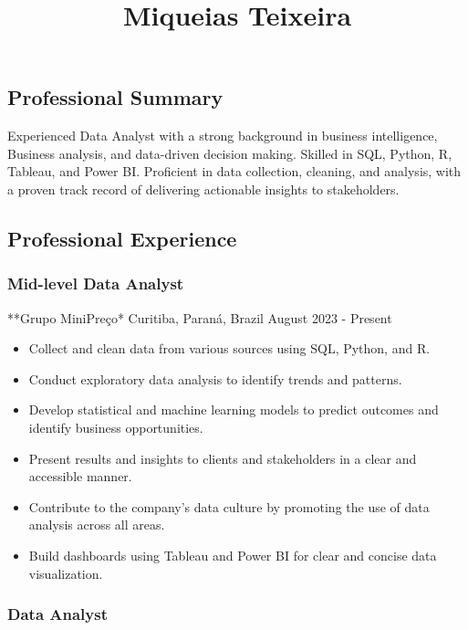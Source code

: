 \documentclass[
]{article}
\title{Miqueias Teixeira}
\author{}
\date{\vspace{-2.5em}}
\providecommand{\tightlist}{%
  \setlength{\itemsep}{0pt}\setlength{\parskip}{0pt}}
\begin{document}
\maketitle

\subsection{Professional Summary}\label{professional-summary}

Experienced Data Analyst with a strong background in business
intelligence, Business analysis, and data-driven decision making.
Skilled in SQL, Python, R, Tableau, and Power BI. Proficient in data
collection, cleaning, and analysis, with a proven track record of
delivering actionable insights to stakeholders.

\subsection{Professional Experience}\label{professional-experience}

\subsubsection{Mid-level Data Analyst}\label{mid-level-data-analyst}

**Grupo MiniPreço* \textbar{} Curitiba, Paraná, Brazil \textbar{} August
2023 - Present

\begin{itemize}
\tightlist
\item
  Collect and clean data from various sources using SQL, Python, and R.
\item
  Conduct exploratory data analysis to identify trends and patterns.
\item
  Develop statistical and machine learning models to predict outcomes
  and identify business opportunities.
\item
  Present results and insights to clients and stakeholders in a clear
  and accessible manner.
\item
  Contribute to the company's data culture by promoting the use of data
  analysis across all areas.
\item
  Build dashboards using Tableau and Power BI for clear and concise data
  visualization.
\end{itemize}

\subsubsection{Data Analyst}\label{data-analyst}
\end{document}
